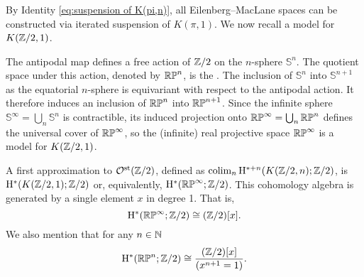 %


\subsubsection{} By Identity \eqref{eq:suspension of K(pi,n)}, all Eilenberg--MacLane spaces can be constructed via iterated suspension of $K(\pi,1)$.
We now recall a model for $K(\mathbb{Z}/2, 1)$.

The antipodal map defines a free action of $\mathbb{Z}/2$ on the $n$-sphere \(\mathbb{S}^n\).
The quotient space under this action, denoted by \(\mathbb{RP}^n\), is the .
The inclusion of \(\mathbb{S}^n\) into \(\mathbb{S}^{n+1}\) as the equatorial $n$-sphere is equivariant with respect to the antipodal action.
It therefore induces an inclusion of \(\mathbb{RP}^n\) into \(\mathbb{RP}^{n+1}\).
Since the infinite sphere \(\mathbb{S}^\infty = \bigcup_n \mathbb{S}^n\) is contractible, its induced projection onto $\mathbb{RP}^\infty = \bigcup_n \mathbb{RP}^n$ defines the universal cover of \(\mathbb{RP}^\infty\), so the (infinite) real projective space $\mathbb{RP}^\infty$ is a model for \(K(\mathbb{Z}/2, 1)\).

A first approximation to $\mathcal{O}^{\mathrm{st}}(\mathbb{Z}/2)$, defined as $\operatorname*{colim}_n \mathrm{H}^{\ast + n}(K(\mathbb{Z}/2, n); \mathbb{Z}/2)$, is $\mathrm{H}^\ast(K(\mathbb{Z}/2, 1); \mathbb{Z}/2)$ or, equivalently, $\mathrm{H}^\ast(\mathbb{RP}^\infty; \mathbb{Z}/2)$.
This cohomology algebra is generated by a single element $x$ in degree 1.
That is,
\[
\mathrm{H}^\ast(\mathbb{RP}^\infty; \mathbb{Z}/2) \cong (\mathbb{Z}/2)[x].
\]
We also mention that for any $n \in \mathbb{N}$
\[
\mathrm{H}^\ast(\mathbb{RP}^n; \mathbb{Z}/2) \cong \frac{(\mathbb{Z}/2)[x]}{(x^{n+1} = 1)}.
\]

